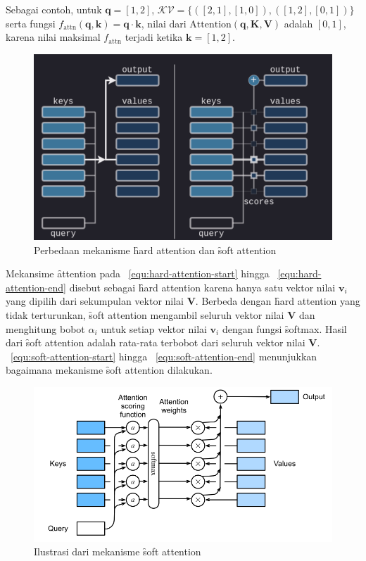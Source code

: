	Sebagai contoh, untuk $\mathbf{q}= [1,2]$, $\mathcal{KV} = \{([2,1],[1,0]), ([1,2],[0,1])\}$ serta fungsi $f_\text{attn}(\mathbf{q}, \mathbf{k}) =\mathbf{q}\cdot \mathbf{k}$, nilai dari $\text{Attention}( \mathbf{q}, \mathbf{K}, \mathbf{V})$ adalah $[0,1]$, karena nilai maksimal $f_\text{attn}$ terjadi ketika $\mathbf{k} = [1,2]$. 
	\begin{figure}
		\centering
		\includegraphics[width=1\textwidth]{assets/pics/hard-soft-attention-diff.png}
		\caption{Perbedaan mekanisme \f{hard attention} dan \f{soft attention} \citep{pi-tau2023transformer}}
		\label{fig:hard-attention}
	\end{figure}
	Mekansime \f{attention} pada \equ~\ref{equ:hard-attention-start} hingga \equ~\ref{equ:hard-attention-end} disebut sebagai \f{hard attention} karena hanya satu vektor nilai $\mathbf{v}_i$ yang dipilih dari sekumpulan vektor nilai $\mathbf{V}$. Berbeda dengan \f{hard attention} yang tidak terturunkan, \f{soft attention} mengambil seluruh vektor nilai $\mathbf{V}$ dan menghitung bobot $\alpha_i$ untuk setiap vektor nilai $\mathbf{v}_i$ dengan fungsi \f{softmax}. Hasil dari \f{soft attention} adalah rata-rata terbobot dari seluruh vektor nilai $\mathbf{V}$. \equ~\ref{equ:soft-attention-start} hingga \equ~\ref{equ:soft-attention-end} menunjukkan bagaimana mekanisme \f{soft attention} dilakukan.
	\begin{figure}
		\centering
		\includegraphics[width=1\textwidth]{assets/pics/softattention.png}
		\caption{Ilustrasi dari mekanisme \f{soft attention} \citep{zhang2023dive}}
		\label{fig:soft-attention}
	\end{figure}
